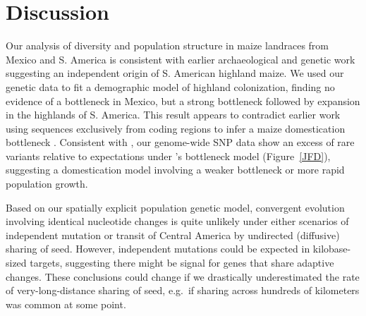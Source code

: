 \section*{Discussion}
Our analysis of diversity and population structure in maize landraces from Mexico and S. America is consistent with earlier archaeological \cite[]{Piperno_2006_69,Perry_2006_16511492,Grobman_2012_22307642} and genetic \citep{vanHeerwaarden_2011_21189301} work suggesting an independent origin of S. American highland maize. 
We used our genetic data to fit a demographic model of highland colonization, finding no evidence of a bottleneck in Mexico, but a strong bottleneck followed by expansion in the highlands of S. America.  
\label{historical models}
This result appears to contradict earlier work using sequences exclusively from coding regions to infer a maize domestication bottleneck \cite[]{Eyre-Walker_1998_9539756,Tenaillon_2004_15014173,Wright_2005_15919994}.  
Consistent with \citet{Hufford_2012_22660546}, our genome-wide SNP data show an excess of rare variants relative to expectations under \cite{Wright_2005_15919994}'s bottleneck model (Figure~\ref{JFD}), suggesting a domestication model involving a weaker bottleneck or more rapid population growth.

\label{no convergence} 
%

\label{theory comparison}
Based on our spatially explicit population genetic model, convergent evolution involving identical nucleotide changes is quite unlikely under either scenarios of independent mutation or transit of Central America by undirected (diffusive) sharing of seed. 
However, independent mutations could be expected in kilobase-sized targets, suggesting there might be signal for genes that share adaptive changes.
These conclusions could change if we drastically underestimated the rate of very-long-distance sharing of seed, e.g.\ if sharing across hundreds of kilometers was common at some point.

